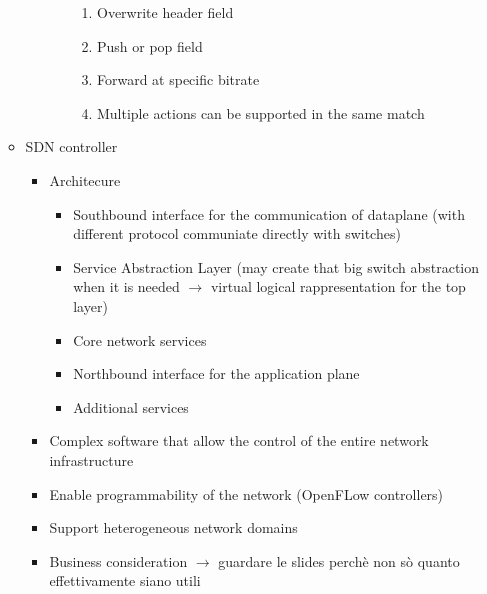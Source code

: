\documentclass{article}
\begin{document}
\begin{itemize}
\begin{itemize}
\begin{itemize}
\begin{itemize}
\begin{enumerate}
                    \item Overwrite header field
                    \item Push or pop field
                    \item Forward at specific bitrate
                    \item Multiple actions can be supported in the same match
                \end{enumerate}
            \end{itemize}
        \end{itemize}
        \item SDN controller
        \begin{itemize}
            \item Architecure
            \begin{itemize}
                \item Southbound interface for the communication of dataplane (with different protocol communiate directly with switches)
                \item Service Abstraction Layer (may create that big switch abstraction when it is needed $\rightarrow$ virtual logical rappresentation for the top layer)
                \item Core network services
                \item Northbound interface for the application plane
                \item Additional services
            \end{itemize}
            \item Complex software that allow the control of the entire network infrastructure
            \item Enable programmability of the network (OpenFLow controllers)
            \item Support heterogeneous network domains
            \item Business consideration $\rightarrow$ guardare le slides perchè non sò quanto effettivamente siano utili
        \end{itemize}
    \end{itemize}
\end{itemize}
\end{document}
